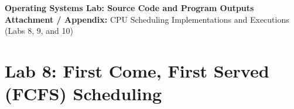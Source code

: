 \documentclass[10pt,a4paper]{article}
\begin{document}
\raggedbottom
\thispagestyle{firstpage}

\begin{center}
  {\Large\bfseries\sffamily\color{primary} Operating Systems Lab: Source Code and Program Outputs}\\[3pt]
  {\normalsize\sffamily\textbf{Attachment / Appendix:} CPU Scheduling Implementations and Executions (Labs 8, 9, and 10)}
\end{center}
\vspace{-4pt}

\section{Lab 8: First Come, First Served (FCFS) Scheduling}
\end{document}
